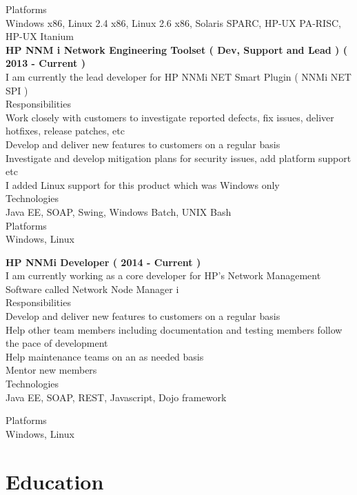 \documentclass[line,margin]{res}
\begin{document}
\begin{resume}
Platforms\\
Windows x86, Linux 2.4 x86, Linux 2.6 x86, Solaris SPARC, HP-UX PA-RISC, HP-UX Itanium\\

{\bf HP NNM i Network Engineering Toolset ( Dev, Support and Lead ) ( 2013 - Current )}\\
I am currently the lead developer for HP NNMi NET Smart Plugin ( NNMi NET SPI )\\

Responsibilities\\
Work closely with customers to investigate reported defects, fix issues, deliver hotfixes, release patches, etc\\
Develop and deliver new features to customers on a regular basis\\
Investigate and develop mitigation plans for security issues, add platform support etc\\
I added Linux support for this product which was Windows only\\

Technologies\\
Java EE, SOAP, Swing, Windows Batch, UNIX Bash\\

Platforms\\
Windows, Linux

{\bf HP NNMi Developer ( 2014 - Current )}\\
I am currently working as a core developer for HP's Network Management Software called Network Node Manager i\\

Responsibilities\\
Develop and deliver new features to customers on a regular basis\\
Help other team members including documentation and testing members follow the pace of development\\
Help maintenance teams on an as needed basis\\
Mentor new members\\

Technologies\\
Java EE, SOAP, REST, Javascript, Dojo framework

Platforms\\
Windows, Linux

\section{Education}


\end{resume}
\end{document}
